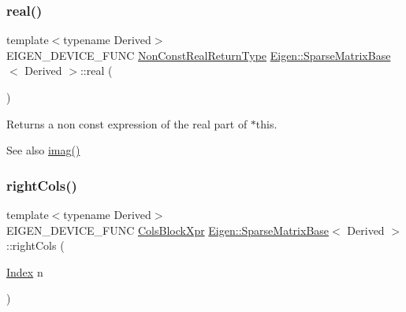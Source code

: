\subsubsection{\texorpdfstring{real()}{real()}\hspace{0.1cm}{\footnotesize\ttfamily [2/2]}}
{\footnotesize\ttfamily template$<$typename Derived$>$ \\
E\+I\+G\+E\+N\+\_\+\+D\+E\+V\+I\+C\+E\+\_\+\+F\+U\+NC \mbox{\hyperlink{struct_eigen_1_1internal_1_1true__type}{Non\+Const\+Real\+Return\+Type}} \mbox{\hyperlink{class_eigen_1_1_sparse_matrix_base}{Eigen\+::\+Sparse\+Matrix\+Base}}$<$ Derived $>$\+::real (\begin{DoxyParamCaption}{ }\end{DoxyParamCaption})\hspace{0.3cm}{\ttfamily [inline]}}

\begin{DoxyReturn}{Returns}
a non const expression of the real part of {\ttfamily $\ast$this}.
\end{DoxyReturn}
\begin{DoxySeeAlso}{See also}
\mbox{\hyperlink{class_eigen_1_1_sparse_matrix_base_aba4d0025dccf8a02d33b76c241e0625a}{imag()}} 
\end{DoxySeeAlso}
\mbox{\label{class_eigen_1_1_sparse_matrix_base_a394f6ce7117933acc10f32dc55ceee81}} 
\subsubsection{\texorpdfstring{rightCols()}{rightCols()}\hspace{0.1cm}{\footnotesize\ttfamily [1/2]}}
{\footnotesize\ttfamily template$<$typename Derived$>$ \\
E\+I\+G\+E\+N\+\_\+\+D\+E\+V\+I\+C\+E\+\_\+\+F\+U\+NC \mbox{\hyperlink{class_eigen_1_1_block}{Cols\+Block\+Xpr}} \mbox{\hyperlink{class_eigen_1_1_sparse_matrix_base}{Eigen\+::\+Sparse\+Matrix\+Base}}$<$ Derived $>$\+::right\+Cols (\begin{DoxyParamCaption}\item[{\mbox{\hyperlink{struct_eigen_1_1_eigen_base_a554f30542cc2316add4b1ea0a492ff02}{Index}}}]{n }\end{DoxyParamCaption})\hspace{0.3cm}{\ttfamily [inline]}}

